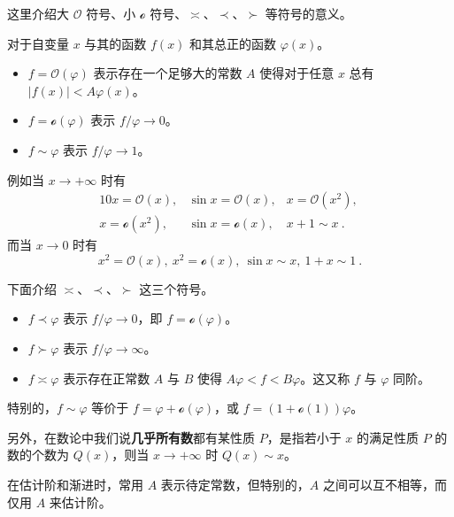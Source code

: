 
这里介绍大 $\mathcal O$ 符号、小 $\mathcal o$ 符号、$\asymp$、$\prec$、$\succ$ 等符号的意义。

对于自变量 $x$ 与其的函数 $f(x)$ 和其总正的函数 $\varphi(x)$。
\begin{itemize}
\item $f=\mathcal O(\varphi)$ 表示存在一个足够大的常数 $A$ 使得对于任意 $x$ 总有 $|f(x)| < A \varphi(x)$。
\item $f = \mathcal o(\varphi)$ 表示 $f/\varphi \rightarrow 0$。
\item $f \sim \varphi$ 表示 $f / \varphi \rightarrow 1$。
\end{itemize}

例如当 $x \rightarrow +\infty$ 时有
\begin{equation}
\begin{matrix}
10x = \mathcal O(x), &\sin x = \mathcal O(x), &x = \mathcal O(x^2), ~\\
x = \mathcal o(x^2), &\sin x = \mathcal o(x), &x + 1 \sim x ~.
\end{matrix}
\end{equation}
而当 $x \rightarrow 0$ 时有
\begin{equation}
x^2 = \mathcal O(x), ~ x^2 = \mathcal o(x), ~ \sin x \sim x , ~ 1+x \sim 1 ~.
\end{equation}

下面介绍 $\asymp$、$\prec$、$\succ$ 这三个符号。
\begin{itemize}
\item $f \prec \varphi$ 表示 $f/\varphi \rightarrow 0$，即 $f = \mathcal o(\varphi)$。
\item $f \succ \varphi$ 表示 $f/\varphi \rightarrow \infty$。
\item $f \asymp \varphi$ 表示存在正常数 $A$ 与 $B$ 使得 $A\varphi < f < B \varphi$。这又称 $f$ 与 $\varphi$ 同阶。
\end{itemize}

特别的，$f \sim \varphi$ 等价于 $f = \varphi + \mathcal o(\varphi)$，或 $f = (1 + \mathcal o(1))\varphi$。

另外，在数论中我们说\textbf{几乎所有数}都有某性质 $P$，是指若小于 $x$ 的满足性质 $P$ 的数的个数为 $Q(x)$，则当 $x \rightarrow +\infty$ 时 $Q(x) \sim x$。

在估计阶和渐进时，常用 $A$ 表示待定常数，但特别的，$A$ 之间可以互不相等，而仅用 $A$ 来估计阶。